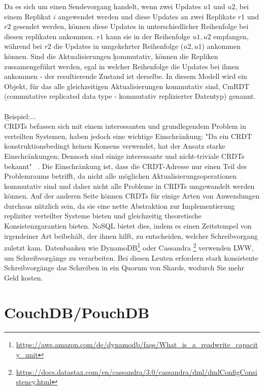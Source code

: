 Da es sich um einen Sendevorgang handelt, wenn zwei Updates $u1$ und $u2$, bei einem Replikat $i$ angewendet werden und diese Updates an zwei Replikate $r1$ und $r2$ gesendet werden, können diese Updates in unterschiedlicher Reihenfolge bei diesen replikaten ankommen. $r1$ kann sie in der Reihenfolge $u1, u2$ empfangen, während bei $r2$ die Updates in umgekehrter Reihenfolge ($u2, u1$) ankommen können. Sind die Aktualisierungen \b{kommutativ}, können die Repliken zussamengeführt werden, egal in welcher Reihenfolge die Updates bei ihnen ankommen - der resultierende Zustand ist derselbe. In diesem Modell wird ein Objekt, für das alle gleichzeitigen Aktualisierungen kommutativ sind, CmRDT (commutative replicated data type - kommutativ replizierter Datentyp) genannt. \\\\
\b{Beispiel:...}\\
CRDTs befassen sich mit einem interessanten und grundlegendem Problem in verteilten Systemen, haben jedoch eine wichtige Einschränkung: "Da ein CRDT konstruktionsbedingt keinen Konsens verwendet, hat der Ansatz starke Einschränkungen; Dennoch sind einige interessante und nicht-triviale CRDTs bekannt" ~\cite{crdt_shapiro2}. Die Einschränkung ist, dass die CRDT-Adresse nur einen Teil des Problemraums betrifft, da nicht alle möglichen Aktualisierungsoperationen kommutativ sind und daher nicht alle Probleme in CRDTs umgewandelt werden können. Auf der anderen Seite können CRDTs für einige Arten von Anwendungen durchaus nützlich sein, da sie eine nette Abstraktion zur Implementierung repliziter verteilter Systeme bieten und gleichzeitig theoretische Konsistenzgarantien bieten.
%
%
NoSQL bietet dies, indem es einen Zeitstempel von irgendeiner Art beibehält, der ihnen hilft, zu entscheiden, welcher Schreibvorgang zuletzt kam. Datenbanken wie DynamoDB\footnote{\url{https://aws.amazon.com/de/dynamodb/faqs/What_is_a_readwrite_capacity_unit}} oder Cassandra \footnote{\url{https://docs.datastax.com/en/cassandra/3.0/cassandra/dml/dmlConfigConsistency.html}} verwenden LWW, um Schreibvorgänge zu verarbeiten. Bei diesen Leuten erfordern stark konsistente Schreibvorgänge das Schreiben in ein Quorum von Shards, wodurch Sie mehr Geld kosten.
%
%
\section{CouchDB/PouchDB}
%
%
